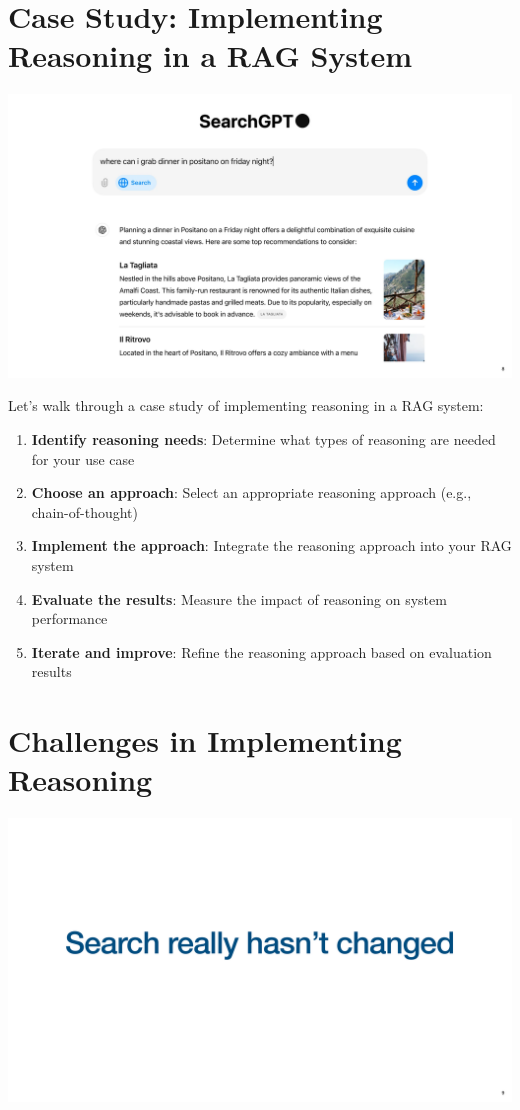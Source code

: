 \documentclass[
  letterpaper,
  oneside]{scrbook}
\providecommand{\tightlist}{%
  \setlength{\itemsep}{0pt}\setlength{\parskip}{0pt}}\usepackage{longtable,booktabs,array}
\begin{document}
\section{Case Study: Implementing Reasoning in a RAG
System}\label{case-study-implementing-reasoning-in-a-rag-system}

\includegraphics{chapters/../p3-images/slide_9.png}

Let's walk through a case study of implementing reasoning in a RAG
system:

\begin{enumerate}
\def\labelenumi{\arabic{enumi}.}
\tightlist
\item
  \textbf{Identify reasoning needs}: Determine what types of reasoning
  are needed for your use case
\item
  \textbf{Choose an approach}: Select an appropriate reasoning approach
  (e.g., chain-of-thought)
\item
  \textbf{Implement the approach}: Integrate the reasoning approach into
  your RAG system
\item
  \textbf{Evaluate the results}: Measure the impact of reasoning on
  system performance
\item
  \textbf{Iterate and improve}: Refine the reasoning approach based on
  evaluation results
\end{enumerate}

\section{Challenges in Implementing
Reasoning}\label{challenges-in-implementing-reasoning}

\includegraphics{chapters/../p3-images/slide_10.png}
\end{document}
